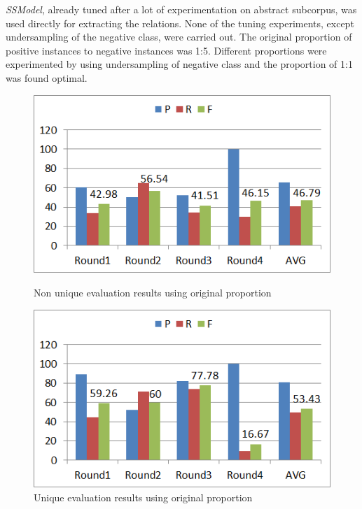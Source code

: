 \textit{SSModel}, already tuned after a lot of experimentation on abstract subcorpus, was used directly for extracting the relations. None of the tuning experiments, except undersampling \cite{akbani2004applying} of the negative class, were carried out. The original proportion of positive instances to negative instances was 1:5. Different proportions were experimented by using undersampling of negative class and the proportion of 1:1 was found optimal.

\begin{figure}
\centering
\begin{minipage}{.5\textwidth}
  \centering
  \includegraphics[width=.95\textwidth]{figures/3_FTOrigRatioResults.png}
  \caption{Non unique evaluation results using original proportion}
  \label{fig:FT_ResOrigNonUniq}
\end{minipage}%
\begin{minipage}{.5\textwidth}
  \centering
  \includegraphics[width=.95\textwidth]{figures/3_FTOrigRatioResults_Uniq.png}
  \caption{Unique evaluation results using original proportion}
  \label{fig:FT_ResOrigUniq}
\end{minipage}
\end{figure}

